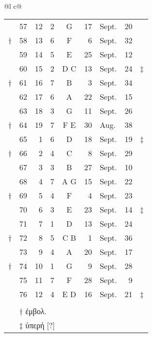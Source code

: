 \begin{tabular}{@{}l c@{}}
\begin{tabular}[t]{@{}r rrcc r@{~}l r l@{}}
~ & 57 & 12 &  2 &  G  & 17 &Sept. & 20 \\
† & 58 & 13 &  6 &  F  &  6 &Sept. & 32 \\
~ & 59 & 14 &  5 &  E  & 25 &Sept. & 12 \\
~ & 60 & 15 &  2 & D C & 13 &Sept. & 24 & ‡ \\
\cmidrule{2-8}
† & 61 & 16 &  7 &  B  &  3 &Sept. & 34 \\
~ & 62 & 17 &  6 &  A  & 22 &Sept. & 15 \\
~ & 63 & 18 &  3 &  G  & 11 &Sept. & 26 \\
† & 64 & 19 &  7 & F E & 30 &Aug.  & 38 \\
\cmidrule{2-8}
~ & 65 &  1 &  6 &  D  & 18 &Sept. & 19 & ‡ \\
† & 66 &  2 &  4 &  C  &  8 &Sept. & 29 \\
~ & 67 &  3 &  3 &  B  & 27 &Sept. & 10 \\
~ & 68 &  4 &  7 & A G & 15 &Sept. & 22 & ~ \\
\cmidrule{2-8}
† & 69 &  5 &  4 &  F  &  4 &Sept. & 23 \\
~ & 70 &  6 &  3 &  E  & 23 &Sept. & 14 & ‡ \\
~ & 71 &  7 &  1 &  D  & 13 &Sept. & 24 \\
† & 72 &  8 &  5 & C B &  1 &Sept. & 36 \\
\cmidrule{2-8}
~ & 73 &  9 &  4 &  A  & 20 &Sept. & 17 \\
† & 74 & 10 &  1 &  G  &  9 &Sept. & 28 \\
~ & 75 & 11 &  7 &  F  & 28 &Sept. &  9 \\
~ & 76 & 12 &  4 & E D & 16 &Sept. & 21 & ‡ \\
\cmidrule{2-8}
\\
~ & \multicolumn{5}{l}{† \textgreek{ἐμβολ.}}\\
~ & \multicolumn{5}{l}{‡ \textgreek{ὑπερή [?]}}\\
\end{tabular}
\end{tabular}
%
